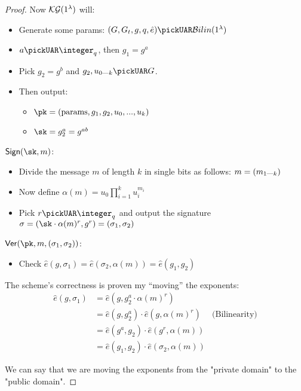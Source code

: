 \begin{proof}

    Now $\mathcal{KG}(1^\lambda)$ will:
    \begin{itemize}
        \item Generate some params: $(G, G_t, g, q, \hat{e}) \pickUAR \mathcal{B}ilin(1^\lambda)$ 
        \item $a \pickUAR \integer_q$, then $g_1 = g^a$
        \item Pick $g_2 = g^b$ and $g_2, u_{0 \upto k} \pickUAR G$.
        \item Then output: 
        \begin{itemize}
            \item $\pk = (\text{params}, g_1, g_2, u_0, ..., u_k)$
            \item $\sk = g_2^a = g^{ab}$
        \end{itemize}
    \end{itemize}

    $\textsf{\textup{Sign}}(\sk, m)$:
    \begin{itemize}
        \item Divide the message $m$ of length $k$ in single bits as follows: $m = (m_{1 \text{---} k})$
        \item Now define $\alpha(m) = u_0\prod_{i = 1}^k u_i^{m_i}$
        \item Pick $r \pickUAR \integer_q$ and output the signature $\sigma = (\sk \cdot \alpha(m)^r,g^r)=(\sigma_1,\sigma_2)$
    \end{itemize}

    $\textsf{\textup{Ver}}(\pk, m, (\sigma_1, \sigma_2))$:
    \begin{itemize}
        \item Check $\hat{e}(g, \sigma_1) = \hat{e}(\sigma_2, \alpha(m)) = \hat{e}(g_1, g_2)$
    \end{itemize}

    The scheme's correctness is proven my ``moving'' the exponents:
    \begin{align*}
        \hat{e}(g, \sigma_1) &= \hat{e}(g,g_2^a\cdot \alpha(m)^r)   & \\
        &= \hat{e}(g,g_2^a) \cdot \hat{e}(g,\alpha(m)^r)            & \text{(Bilinearity)}\\
        &= \hat{e}(g^a,g_2)\cdot \hat{e}(g^r,\alpha(m))             & \\
        &= \hat{e}(g_1,g_2)\cdot\hat{e}(\sigma_2,\alpha(m))         &
    \end{align*}
    
    We can say that we are moving the exponents from the "private domain" to the "public domain".

\end{proof}

